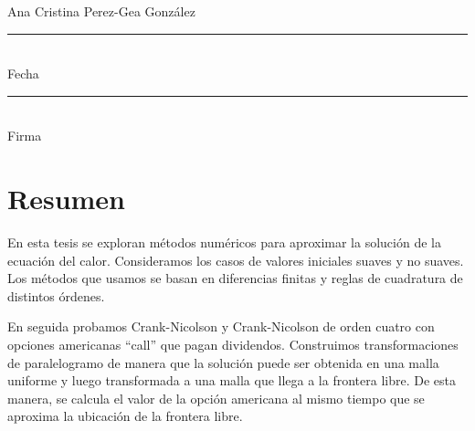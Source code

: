 \documentclass[11pt,letterpaper]{book}
\theoremstyle{definition}
\begin{document}
\vfill

\begin{center}
Ana Cristina Perez-Gea González\\
\vspace{1.5cm}

\rule{7cm}{1pt}\\
Fecha\vspace{1.5cm}\\
\rule{7cm}{1pt}\\
Firma\\
\end{center}


\chapter*{Resumen}

En esta tesis se exploran métodos numéricos para aproximar la solución de la ecuación del calor. Consideramos los casos de valores iniciales suaves y no suaves. Los métodos que usamos se basan en diferencias finitas y reglas de cuadratura de distintos órdenes.

En seguida probamos Crank-Nicolson y Crank-Nicolson de orden cuatro con opciones americanas ``call'' que pagan dividendos. Construimos transformaciones de paralelogramo de manera que la solución puede ser obtenida en una malla uniforme y luego transformada a una malla que llega a la frontera libre. De esta manera, se calcula el valor de la opción americana al mismo tiempo que se aproxima la ubicación de la frontera libre.


\newpage
\mbox{}
\end{document}
